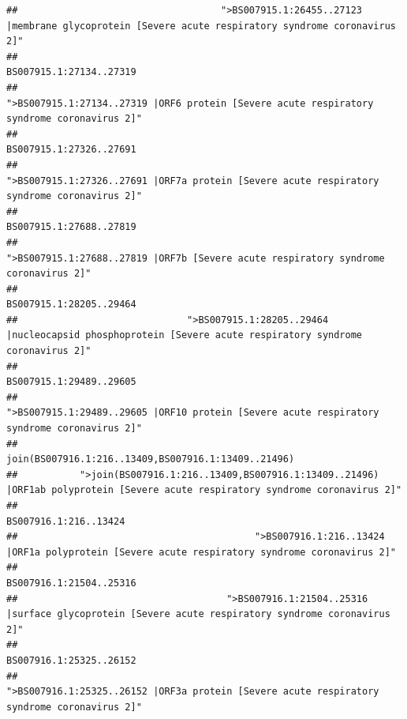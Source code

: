 \documentclass[
]{article}
\begin{document}
\begin{verbatim}
##                                    ">BS007915.1:26455..27123 |membrane glycoprotein [Severe acute respiratory syndrome coronavirus 2]" 
##                                                                                                                BS007915.1:27134..27319 
##                                             ">BS007915.1:27134..27319 |ORF6 protein [Severe acute respiratory syndrome coronavirus 2]" 
##                                                                                                                BS007915.1:27326..27691 
##                                            ">BS007915.1:27326..27691 |ORF7a protein [Severe acute respiratory syndrome coronavirus 2]" 
##                                                                                                                BS007915.1:27688..27819 
##                                                    ">BS007915.1:27688..27819 |ORF7b [Severe acute respiratory syndrome coronavirus 2]" 
##                                                                                                                BS007915.1:28205..29464 
##                              ">BS007915.1:28205..29464 |nucleocapsid phosphoprotein [Severe acute respiratory syndrome coronavirus 2]" 
##                                                                                                                BS007915.1:29489..29605 
##                                            ">BS007915.1:29489..29605 |ORF10 protein [Severe acute respiratory syndrome coronavirus 2]" 
##                                                                                    join(BS007916.1:216..13409,BS007916.1:13409..21496) 
##           ">join(BS007916.1:216..13409,BS007916.1:13409..21496) |ORF1ab polyprotein [Severe acute respiratory syndrome coronavirus 2]" 
##                                                                                                                  BS007916.1:216..13424 
##                                          ">BS007916.1:216..13424 |ORF1a polyprotein [Severe acute respiratory syndrome coronavirus 2]" 
##                                                                                                                BS007916.1:21504..25316 
##                                     ">BS007916.1:21504..25316 |surface glycoprotein [Severe acute respiratory syndrome coronavirus 2]" 
##                                                                                                                BS007916.1:25325..26152 
##                                            ">BS007916.1:25325..26152 |ORF3a protein [Severe acute respiratory syndrome coronavirus 2]" 

\end{verbatim}
\end{document}
